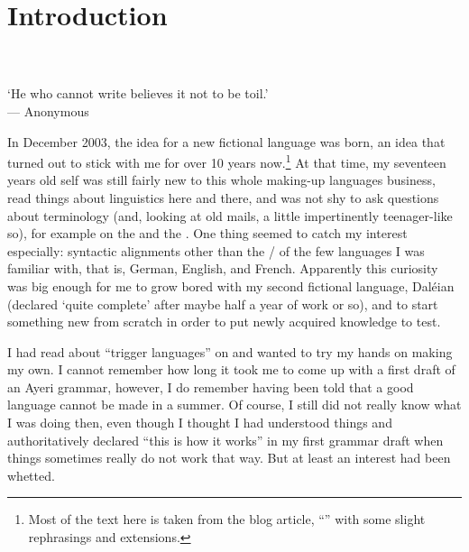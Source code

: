
\setcounter{chapter}{-1}
\chapter{Introduction}
\label{ch:introduction}

\begin{minipage}{\linewidth}\raggedleft\smaller
{}\\
\\
`He who cannot write believes it not to be toil.'\\
--- Anonymous\footnotemark
\end{minipage}\bigskip\bigskip


\noindent In December 2003, the idea for a new fictional language was born, an
idea that turned out to stick with me for over 10 years now.\footnote{Most of
the text here is taken from the blog article,
``'' \parencite{benung:happybirthday} with some
slight rephrasings and extensions.} At that time, my seventeen years old self
was still fairly new to this whole making-up languages business, read things
about linguistics here and there, and was not shy to ask questions about
terminology (and, looking at old mails, a little impertinently teenager-like
so), for example on the \citetitle*{conlangl} and the \citetitle*{zbb}. One
thing seemed to catch my interest especially: syntactic alignments other than
the \Nom{}/\Acc{} of the few languages I was familiar with, that is, German,
English, and French. Apparently this curiosity was big enough for me to grow
bored with my second fictional language, Daléian (declared `quite complete'
after maybe half a year of work or so), and to start something new from scratch
in order to put newly acquired knowledge to test.

I had read about ``trigger languages'' on  and wanted to
try my hands on making my own. I cannot remember how long it took me to come up
with a first draft of an Ayeri grammar, however, I do remember having been told
that a good language cannot be made in a summer. Of course, I still did not
really know what I was doing then, even though I thought I had understood
things and authoritatively declared ``this is how it works'' in my first
grammar draft when things sometimes really do not work that way. But at least
an interest had been whetted.


